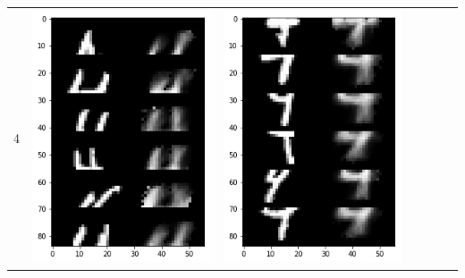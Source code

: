 \documentclass[12pt]{report} %
\begin{document}
\begin{tabular}{m{0.7cm}m{2.4cm}m{2.4cm}m{2.4cm}m{2.4cm}m{2.4cm}m{2.4cm}}
4 & \includegraphics[scale=0.3]{pictures/KE_4_up.png} & \includegraphics[scale=0.3]{pictures/KE_4_down.png} &

\end{tabular}
\end{document}
